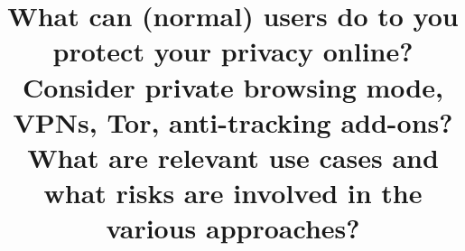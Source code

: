 \documentclass[a4paper]{llncs}
\begin{document}
\mainmatter

\title{What can (normal) users do to you protect your privacy online? Consider private browsing mode, VPNs, Tor, anti-tracking add-ons? What are relevant use cases and what risks are involved in the various approaches?} 


\author{} %
\institute{} %

\maketitle





\end{document}
